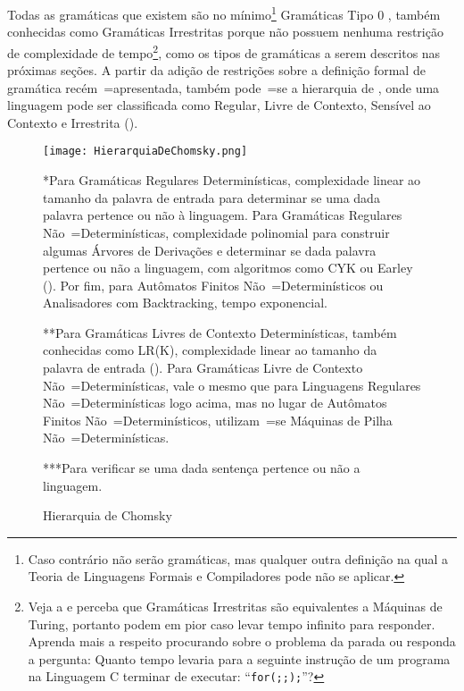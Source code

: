 Todas as gramáticas que existem são no mínimo\footnote{
Caso contrário não serão gramáticas,
mas qualquer outra definição na qual a Teoria de Linguagens Formais e
Compiladores pode não se aplicar.
}
Gramáticas Tipo 0 \cite{ahoTheoryOfParsing,chomskyGrammars1956},
também conhecidas como Gramáticas Irrestritas porque não possuem nenhuma restrição de complexidade de tempo\footnote{
Veja a  e
perceba que Gramáticas Irrestritas são equivalentes a Máquinas de Turing,
portanto podem em pior caso levar tempo infinito para responder.
Aprenda mais a respeito procurando sobre o problema da parada \cite{turingMachinesRoyer,sipserBook} ou
responda a pergunta:
Quanto tempo levaria para a seguinte instrução de um programa na Linguagem C terminar de executar:
``\texttt{for(;;);}''?
},
como os tipos de gramáticas a serem descritos nas próximas seções.
A partir da adição de restrições sobre a definição formal de gramática recém~=apresentada,
também pode~=se  a hierarquia de ,
onde uma linguagem pode ser classificada como Regular,
Livre de Contexto,
Sensível ao Contexto e
Irrestrita ().
\begin{figure}[!htb]
\caption{Hierarquia de Chomsky}
\label{figure:FigureHierarquiaDeChomsky}
\centering
\texttt{[image: HierarquiaDeChomsky.png]}
\begin{minipage}{\textwidth} \footnotesize
*Para Gramáticas Regulares Determinísticas,
complexidade linear ao tamanho da palavra de entrada para determinar se uma dada palavra pertence ou
não à linguagem.
Para Gramáticas Regulares Não~=Determinísticas,
complexidade polinomial para construir algumas Árvores de Derivações e
determinar se dada palavra pertence ou
não a linguagem,
com algoritmos como CYK ou
Earley ().
Por fim,
para Autômatos Finitos Não~=Determinísticos ou
Analisadores com Backtracking,
tempo exponencial.

**Para Gramáticas Livres de Contexto Determinísticas,
também conhecidas como LR(K),
complexidade linear ao tamanho da palavra de entrada ().
Para Gramáticas Livre de Contexto Não~=Determinísticas,
vale o mesmo que para Linguagens Regulares Não~=Determinísticas logo acima,
mas no lugar de Autômatos Finitos Não~=Determinísticos,
utilizam~=se Máquinas de Pilha Não~=Determinísticas.

***Para verificar se uma dada sentença pertence ou
não a linguagem.
\end{minipage}
\end{figure}


